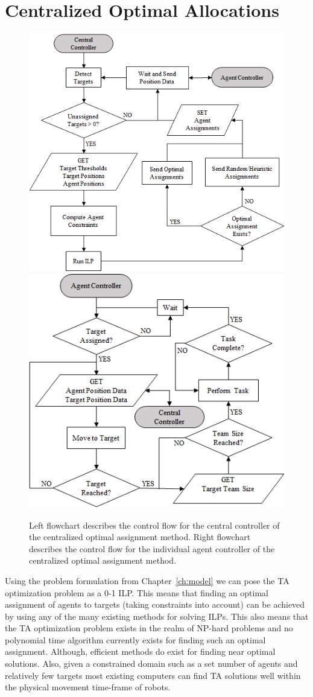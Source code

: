 \documentclass[defaultstyle,12pt]{thesis}
\begin{document}
\section{Centralized Optimal Allocations}
\begin{figure}[!ht]
\centering\includegraphics[width=.49\columnwidth]{../assets/CentralController.png}
\centering\includegraphics[width=.49\columnwidth]{../assets/AgentController.png}
\centering\caption{Left flowchart describes the control flow for the central controller of the centralized optimal assignment method. Right flowchart describes the control flow for the individual agent controller of the centralized optimal assignment method.}\label{fig:centralcontrol}
\end{figure}

Using the problem formulation from Chapter~\ref{ch:model} we can pose the TA optimization problem as a 0-1 ILP. This means that finding an optimal assignment of agents to targets (taking constraints into account) can be achieved by using any of the many existing methods for solving ILPs. This also means that the TA optimization problem exists in the realm of NP-hard problems and no polynomial time algorithm currently exists for finding such an optimal assignment. Although, efficient methods do exist for finding near optimal solutions. Also, given a constrained domain such as a set number of agents and relatively few targets most existing computers can find TA solutions well within the physical movement time-frame of robots. 
\end{document}

